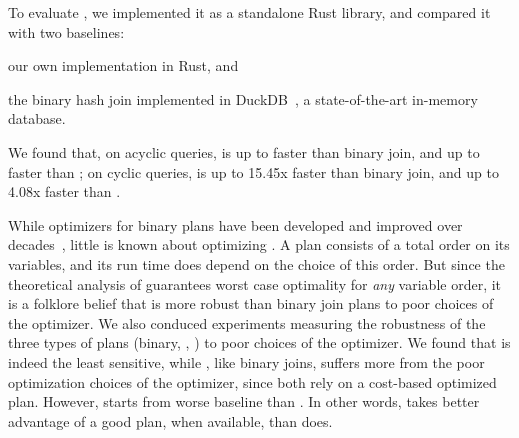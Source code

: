 To evaluate \FJ, we implemented it as a standalone Rust library, and
compared it with two baselines:
  \begin{enumerate*}
    \item our own \GJ implementation in Rust, and
    \item the binary hash join implemented in
      DuckDB~\cite{DBLP:conf/cidr/RaasveldtM20,DBLP:conf/vldb/Raasveldt22},
      a state-of-the-art in-memory database.
    \end{enumerate*}
  We found that, on acyclic queries, \FJ is up to \imdbmaxfjbj
  faster than binary join, and up to \imdbmaxfjgj faster than \GJ; on
  cyclic queries, \FJ is up to 15.45x faster than binary join, and up
  to 4.08x faster than \GJ.

  While optimizers for binary plans have been developed and improved
  over decades~\cite{DBLP:conf/sigmod/SelingerACLP79}, little
  is known about optimizing \GJ.  A \GJ plan consists of a total order
  on its variables, and its run time does depend on the choice of this
  order.  But since the theoretical analysis of \GJ guarantees worst
  case optimality for {\em any} variable order, it is a folklore
  belief that \GJ is more robust than binary join plans to poor
  choices of the optimizer.  We also conduced experiments measuring
  the robustness of the three types of plans (binary, \GJ, \FJ) to
  poor choices of the optimizer.  We found that \GJ is indeed the
  least sensitive, while \FJ, like binary joins, suffers more from the
  poor optimization choices of the optimizer, since both rely on a
  cost-based optimized plan.  However, \GJ starts from worse baseline
  than \FJ.  In other words, \FJ takes better advantage of a good
  plan, when available, than \GJ does.


